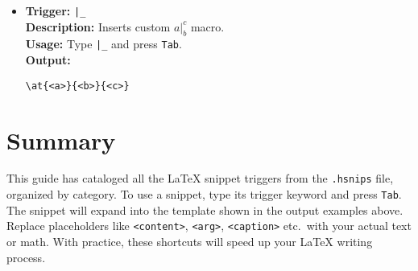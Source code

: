 \documentclass{article}
\newcommand{\at}[3]{#1|_{#2}^{#3}}
\begin{document}
\begin{itemize}[leftmargin=*, label={}]
\item \textbf{Trigger:} \texttt{|\_} \\
\textbf{Description:} Inserts custom \(\at{a}{b}{c}\) macro. \\
\textbf{Usage:} Type \texttt{|\_} and press \texttt{Tab}. \\
\textbf{Output:}
\begin{verbatim}
\at{<a>}{<b>}{<c>}
\end{verbatim}
\end{itemize}

\section{Summary}
This guide has cataloged all the \LaTeX{} snippet triggers from the \texttt{.hsnips} file, organized by category. To use a snippet, type its trigger keyword and press \texttt{Tab}. The snippet will expand into the template shown in the output examples above. Replace placeholders like \texttt{<content>}, \texttt{<arg>}, \texttt{<caption>} etc.\ with your actual text or math. With practice, these shortcuts will speed up your \LaTeX{} writing process.
\end{document}
